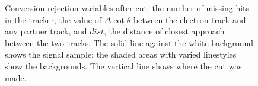  \begin{figure}[htb]
  \begin{center}
  \end{center}
  \caption[\fixspacing Conversion rejection variables after \Et cut]
  {\fixspacing Conversion rejection variables after \Et cut: 
   the number of missing hits in the tracker, 
   the value of $\Delta\cot\theta$ 
  between the electron track and any partner track, and 
   $dist$, 
  the distance of closest approach between the two tracks. 
  The solid line against the white background shows the signal sample; 
  the shaded areas with varied linestyles show the backgrounds. 
  The vertical line shows where the cut was made.  
  }
  \label{fig:ConvRejVars}
 \end{figure}


